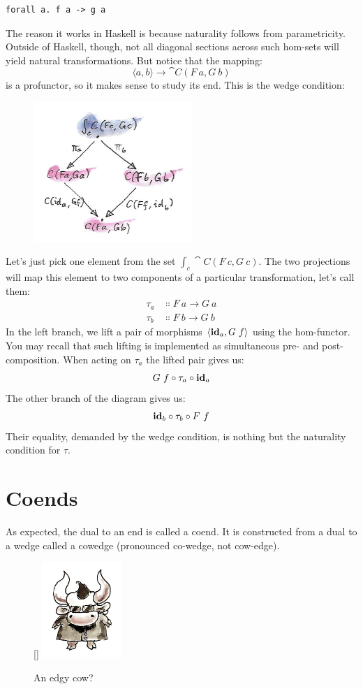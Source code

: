 \begin{Verbatim}
forall a. f a -> g a
\end{Verbatim}
The reason it works in Haskell is because naturality follows from
parametricity. Outside of Haskell, though, not all diagonal sections
across such hom-sets will yield natural transformations. But notice that
the mapping:
\[\langle a, b \rangle \to \cat{C}(F\ a, G\ b)\]
is a profunctor, so it makes sense to study its end. This is the wedge
condition:

\begin{figure}[H]
\centering
\includegraphics[width=60mm]{images/end1.jpg}
\end{figure}

\noindent
Let's just pick one element from the set $\int_c \cat{C}(F\ c, G\ c)$.
The two projections will map this element to two components of a
particular transformation, let's call them:
\begin{align*}
\tau_a &\Colon F\ a \to G\ a \\
\tau_b &\Colon F\ b \to G\ b
\end{align*}
In the left branch, we lift a pair of morphisms
$\langle \idarrow[a], G\ f \rangle$ using the hom-functor. You
may recall that such lifting is implemented as simultaneous pre- and
post-composition. When acting on $\tau_a$ the lifted pair gives us:
\[G\ f \circ \tau_a \circ \idarrow[a]\]
The other branch of the diagram gives us:
\[\idarrow[b] \circ \tau_b \circ F\ f\]
Their equality, demanded by the wedge condition, is nothing but the
naturality condition for $\tau$.

\section{Coends}
As expected, the dual to an end is called a coend. It is constructed
from a dual to a wedge called a cowedge (pronounced co-wedge, not
cow-edge).

\begin{figure}
\raisebox{0pt}[\dimexpr{}\baselineskip\relax]{
\includegraphics[width=30mm]{images/end-31.jpg}}%
\caption{An edgy cow?}
\end{figure}

